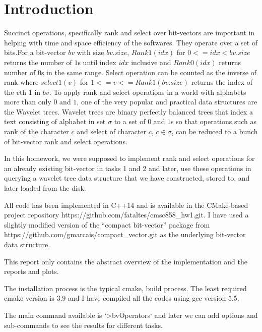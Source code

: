 \documentclass[11pt]{article}
\begin{document}
    \section{Introduction}
    Succinct operations, specifically rank and select over bit-vectors are important in helping with time and space efficiency of the softwares.
    They operate over a set of bits.For a bit-vector $bv$ with size $bv.size$, $Rank1(idx)$ for $0<=idx<bv.size$
    returns the number of $1$s until index $idx$ inclusive and $Rank0(idx)$ returns number of $0$s in the same range.
    Select operation can be counted as the inverse of rank where $select1(v)$ for $1<=v<=Rank1(bv.size)$ returns the index of the $v$th $1$ in $bv$.
    To apply rank and select operations in a world with alphabets more than only $0$ and $1$, one of the very popular
    and practical data structures are the Wavelet trees. Wavelet trees are binary perfectly balanced trees
    that index a text consisting of alphabet in set $\sigma$ to a set of $0$ and $1$s so that operations such as rank of the character $c$
    and select of character $c$, $c \in \sigma$, can be reduced to a bunch of bit-vector rank and select operations.

    In this homework, we were supposed to implement rank and select operations for an already existing bit-vector in tasks 1 and 2
    and later, use these operations in querying a wavelet tree data structure that we have constructed, stored to, and later loaded from the disk.

    All code has been implemented in C++14 and is available in the CMake-based project repository https://github.com/fataltes/cmsc858_hw1.git.
    I have used a slightly modified version of the ``compact bit-vector'' package from https://github.com/gmarcais/compact_vector.git as the underlying bit-vector data structure.

    This report only contains the abstract overview of the implementation and the reports and plots.

    The installation process is the typical cmake, build process. The least required cmake version is $3.9$
    and I have compiled all the codes using gcc version $5.5$.

    The main command available is `>bvOperators` and later we can add options and sub-commands to see the results for different tasks.
\end{document}
